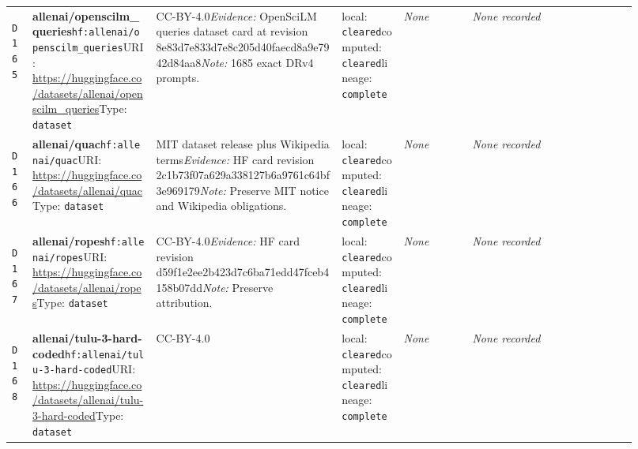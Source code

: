 \documentclass[9pt,a4paper]{article}
\newcommand{\depid}[1]{\hypertarget{dep:#1}{\texttt{#1}}}
\begin{document}
\begin{landscape}
\begin{longtable}{@{}L{0.035\linewidth}L{0.185\linewidth}L{0.27\linewidth}L{0.09\linewidth}L{0.10\linewidth}L{0.24\linewidth}@{}}
\depid{D165} & \textbf{allenai/openscilm\_queries}\newline \nolinkurl{hf:allenai/openscilm_queries}\newline URI: \url{https://huggingface.co/datasets/allenai/openscilm_queries}\newline Type: \texttt{dataset} & CC-BY-4.0\newline \textit{Evidence:} OpenSciLM queries dataset card at revision 8e83d7e833d7e8c205d40faecd8a9e7942d84aa8\newline \textit{Note:} 1685 exact DRv4 prompts. & local: \texttt{cleared}\newline computed: \texttt{cleared}\newline lineage: \texttt{complete} & \textit{None} & \textit{None recorded} \\
\depid{D166} & \textbf{allenai/quac}\newline \nolinkurl{hf:allenai/quac}\newline URI: \url{https://huggingface.co/datasets/allenai/quac}\newline Type: \texttt{dataset} & MIT dataset release plus Wikipedia terms\newline \textit{Evidence:} HF card revision 2c1b73f07a629a338127b6a9761c64bf3e969179\newline \textit{Note:} Preserve MIT notice and Wikipedia obligations. & local: \texttt{cleared}\newline computed: \texttt{cleared}\newline lineage: \texttt{complete} & \textit{None} & \textit{None recorded} \\
\depid{D167} & \textbf{allenai/ropes}\newline \nolinkurl{hf:allenai/ropes}\newline URI: \url{https://huggingface.co/datasets/allenai/ropes}\newline Type: \texttt{dataset} & CC-BY-4.0\newline \textit{Evidence:} HF card revision d59f1e2ee2b423d7c6ba71edd47fceb4158b07dd\newline \textit{Note:} Preserve attribution. & local: \texttt{cleared}\newline computed: \texttt{cleared}\newline lineage: \texttt{complete} & \textit{None} & \textit{None recorded} \\
\depid{D168} & \textbf{allenai/tulu-3-hard-coded}\newline \nolinkurl{hf:allenai/tulu-3-hard-coded}\newline URI: \url{https://huggingface.co/datasets/allenai/tulu-3-hard-coded}\newline Type: \texttt{dataset} & CC-BY-4.0 & local: \texttt{cleared}\newline computed: \texttt{cleared}\newline lineage: \texttt{complete} & \textit{None} & \textit{None recorded} \\

\end{longtable}
\end{landscape}
\end{document}
